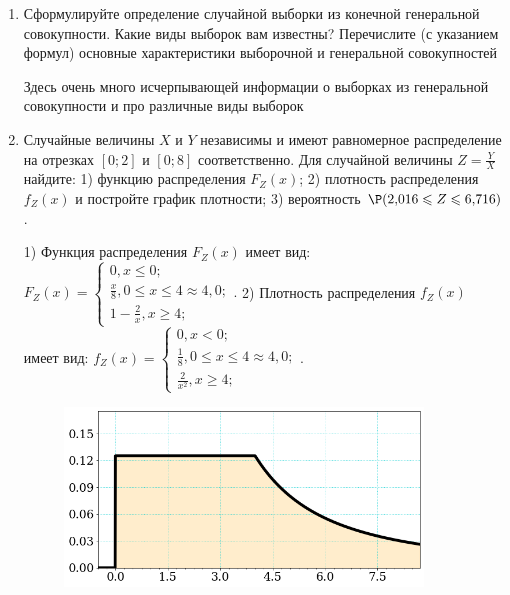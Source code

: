 \documentclass[a4paper,14pt]{article}
\begin{document}
\begin{enumerate}


\item


Сформулируйте определение случайной выборки из конечной генеральной совокупности. Какие
виды выборок вам известны? Перечислите (с указанием формул) основные характеристики выборочной и генеральной совокупностей




Здесь очень много исчерпывающей информации о выборках из генеральной совокупности и про различные виды выборок


\item



Случайные величины $X$ и $Y$ независимы и имеют равномерное
распределение на отрезках $[0;2]$ и $[0;8]$ соответственно. Для случайной величины $Z=\frac{Y}{X}$ найдите: 
1) функцию распределения $F_Z(x)$;
2) плотность распределения $f_Z(x)$ и постройте график плотности;
3) вероятность $\P(2,\!016\leqslant Z\leqslant 6,\!716)$.




1) Функция распределения $F_Z(x)$ имеет вид:
$
F_Z(x)=\left\{
\begin{array}{l}
0, x\leqslant 0;\\
\frac{x}{8}, 0\leqslant x\leqslant 4\approx 4,\!0;\\
1 - \frac{2}{x}, x\geqslant4;
\end{array}.
\right.
$
2) Плотность распределения $f_Z(x)$ имеет вид:
$
f_Z(x)=\left\{
\begin{array}{l}
0, x<0;\\
\frac{1}{8}, 0\leqslant x\leqslant 4\approx 4,\!0;\\
\frac{2}{x^{2}}, x\geqslant4;
\end{array}.
\right.
$


\begin{figure}[H]
    \includegraphics[width=0.9\textwidth]{2_53d24}
\end{figure}



\end{enumerate}
\end{document}
